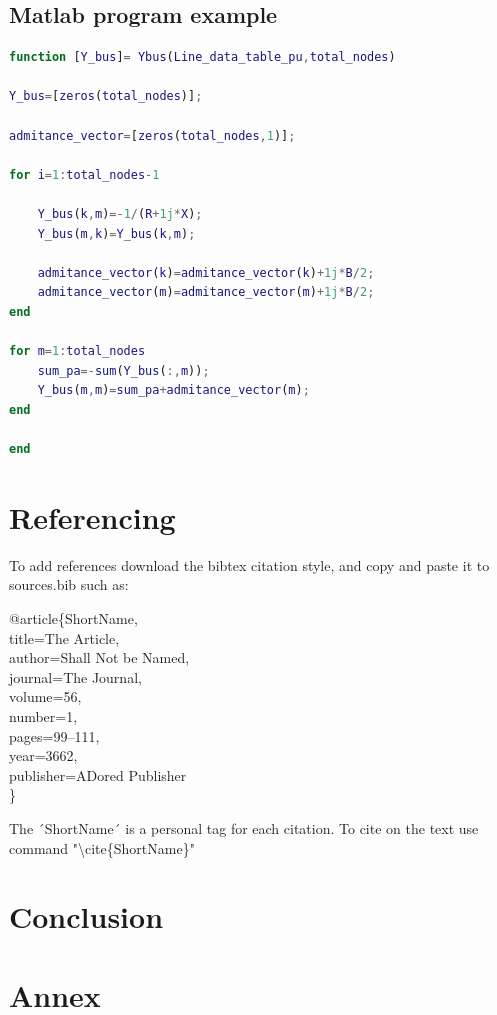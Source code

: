 \documentclass[a4paper,11pt, titlepage, twoside]{article}
\newcommand{\sectionbreak}{\clearpage}
\begin{document}
\subsection{Matlab program example}
\begin{lstlisting}[language=Matlab,style=Matlab]
function [Y_bus]= Ybus(Line_data_table_pu,total_nodes)

Y_bus=[zeros(total_nodes)];

admitance_vector=[zeros(total_nodes,1)];

for i=1:total_nodes-1

    Y_bus(k,m)=-1/(R+1j*X);
    Y_bus(m,k)=Y_bus(k,m);
    
    admitance_vector(k)=admitance_vector(k)+1j*B/2;
    admitance_vector(m)=admitance_vector(m)+1j*B/2;
end

for m=1:total_nodes
    sum_pa=-sum(Y_bus(:,m));
    Y_bus(m,m)=sum_pa+admitance_vector(m);
end

end
\end{lstlisting}
\section{Referencing}
To add references download the bibtex citation style, and copy and paste it to sources.bib such as:

@article\{ShortName, \\
  title={The Article},\\
  author={Shall Not be Named},\\
  journal={The Journal},\\
  volume={56},\\
  number={1},\\
  pages={99--111},\\
  year={3662},\\
  publisher={ADored Publisher}\\
\}

The ´ShortName´ is a personal tag for each citation. To cite on the text use command "\textbackslash cite\{ShortName\}"\cite{ShortName} 

\section*{Conclusion}


\lipsum[3-5]


 \printbibliography
\sectionbreak

\section*{Annex}

\sectionbreak
\end{document}
